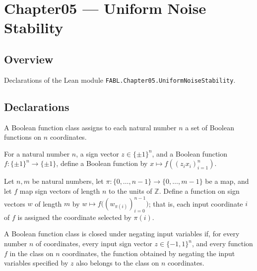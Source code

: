 \chapter{Chapter05 — Uniform Noise Stability}
\section{Overview}

Declarations of the Lean module \texttt{FABL.Chapter05.UniformNoiseStability}.

\section{Declarations}

\begin{definition}
\label{FABL.BooleanClass}
\leanok
{}
A Boolean function class assigns to each natural number $n$ a set of Boolean functions
on $n$ coordinates.
\end{definition}

\begin{definition}
\label{FABL.negateInputVariables}
\leanok
{}
For a natural number $n$, a sign vector $z\in\{\pm1\}^n$, and a Boolean function
$f:\{\pm1\}^n\to\{\pm1\}$, define a Boolean function by $x\mapsto f((z_i x_i)_{i=1}^n)$.
\end{definition}

\begin{definition}
\label{FABL.identifyInputVariables}
\leanok
{}
Let $n,m$ be natural numbers, let $\pi:\{0,\ldots,n-1\}\to\{0,\ldots,m-1\}$ be a map,
and let $f$ map sign vectors of length $n$ to the units of $\mathbb Z$. Define a
function on sign vectors $w$ of length $m$ by $w\mapsto
f\bigl((w_{\pi(i)})_{i=0}^{n-1}\bigr)$; that is, each input coordinate $i$ of $f$ is
assigned the coordinate selected by $\pi(i)$.
\end{definition}

\begin{definition}
\label{FABL.IsClosedUnderNegatingInputVariables}
\leanok
{}
A Boolean function class is closed under negating input variables if, for every number
$n$ of coordinates, every input sign vector $z\in\{-1,1\}^n$, and every function $f$ in
the class on $n$ coordinates, the function obtained by negating the input variables
specified by $z$ also belongs to the class on $n$ coordinates.
\end{definition}

